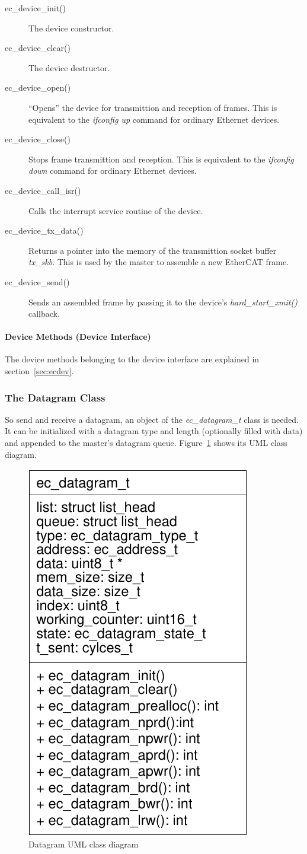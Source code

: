 \documentclass[a4paper,12pt,BCOR6mm,bibtotoc,idxtotoc]{scrbook}
\begin{document}
\begin{description}
\item[ec\_device\_init()] The device constructor.
\item[ec\_device\_clear()] The device destructor.
\item[ec\_device\_open()] ``Opens'' the device for transmittion and
  reception of frames. This is equivalent to the \textit{ifconfig up}
  command for ordinary Ethernet devices.
\item[ec\_device\_close()] Stops frame transmittion and reception.
  This is equivalent to the \textit{ifconfig down} command for
  ordinary Ethernet devices.
\item[ec\_device\_call\_isr()] Calls the interrupt service routine of
  the device.
\item[ec\_device\_tx\_data()] Returns a pointer into the memory of the
  transmittion socket buffer \textit{tx\_skb}. This is used by the
  master to assemble a new EtherCAT frame.
\item[ec\_device\_send()] Sends an assembled frame by passing it to
  the device's \textit{hard\_\-start\_\-xmit()} callback.
\end{description}

\paragraph{Device Methods (Device Interface)}

The device methods belonging to the device interface are explained in
section~\ref{sec:ecdev}.


\subsubsection{The Datagram Class}
\label{sec:class-datagram}

So send and receive a datagram, an object of the
\textit{ec\_datagram\_t} class is needed. It can be initialized with a
datagram type \cite[section~5.4]{dlspec} and length (optionally filled
with data) and appended to the master's datagram queue.
Figure~\ref{fig:uml-datagram} shows its UML class diagram.

\begin{figure}[htbp]
  \centering
  \includegraphics[width=.3\textwidth]{images/uml-datagram}
  \caption{Datagram UML class diagram}
  \label{fig:uml-datagram}
\end{figure}
\end{document}
